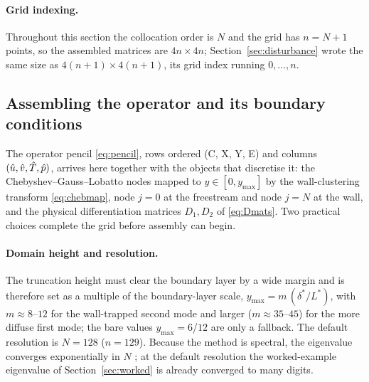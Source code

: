 \documentclass[11pt]{article}
\begin{document}
\paragraph{Grid indexing.} Throughout this section the collocation order is $N$ and the grid
has $n=N{+}1$ points, so the assembled matrices are $4n\times4n$; Section~\ref{sec:disturbance}
wrote the same size as $4(n{+}1)\times4(n{+}1)$, its grid index running $0,\dots,n$.


\subsection{Assembling the operator and its boundary conditions}\label{sec:assemble}
The operator pencil \eqref{eq:pencil}, rows ordered (C, X, Y, E) and columns
$(\hat{u},\hat{v},\hat{T},\hat{p})$, arrives here together with the objects that discretise it: the
Chebyshev--Gauss--Lobatto nodes mapped to $y\in[0,y_{\max}]$ by the wall-clustering transform
\eqref{eq:chebmap}, node $j{=}0$ at the freestream and node $j{=}N$ at the wall, and the physical
differentiation matrices $D_1,D_2$ of \eqref{eq:Dmats}. Two practical choices complete the grid
before assembly can begin.

\paragraph{Domain height and resolution.} The truncation height must clear the boundary layer by a
wide margin and is therefore set as a multiple of the boundary-layer scale,
$y_{\max}=m\,(\delta^*/L^*)$, with $m\approx8$--$12$ for the wall-trapped second mode and larger
($m\approx35$--$45$) for the more diffuse first mode; the bare values $y_{\max}=6$/$12$ are only a
fallback. The default resolution is $N=128$ ($n=129$). Because the method is spectral, the eigenvalue
converges exponentially in $N$ \cite{orszag1971,trefethen2000}; at the default resolution the
worked-example eigenvalue of Section~\ref{sec:worked} is already converged to many digits.
\end{document}
